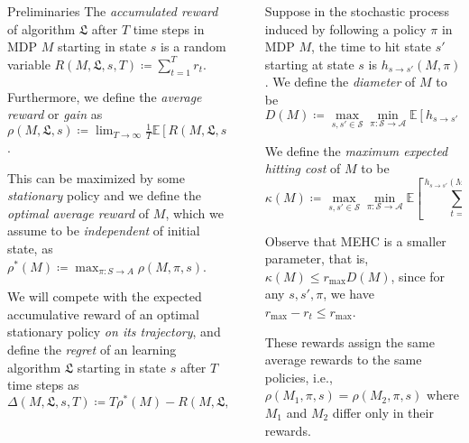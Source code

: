 \documentclass[final]{beamer}
\newcommand{\Exp}{\mathbb{E}}
\newlength{\sepwidth}
\newlength{\colwidth}
\newcommand{\separatorcolumn}{\begin{column}{\sepwidth}\end{column}}
\begin{document}
\begin{frame}[t]
\begin{columns}[t]
\begin{column}{\colwidth}
\begin{block}{Preliminaries}
    The \textit{accumulated reward} of algorithm $\mathfrak{L}$ after $T$ time steps in MDP $M$ starting in state $s$ is a random variable $R(M, \mathfrak{L}, s, T) \coloneqq \sum_{t=1}^T r_t$.

    Furthermore, we define the \textit{average reward} or \textit{gain} as $\rho(M, \mathfrak{L}, s) \coloneqq \lim_{T \rightarrow \infty} \frac{1}{T} \Exp \left[ R(M, \mathfrak{L}, s, T) \right]$.

    This can be maximized by some \textit{stationary} policy and we define the \textit{optimal average reward} of $M$, which we assume to be \textit{independent} of initial state, as $\rho^*(M) \coloneqq \max_{\pi : S \rightarrow A} \rho(M, \pi, s)$.

    We will compete with the expected accumulative reward of an optimal stationary policy \textit{on its trajectory}, and define the \textit{regret} of an learning algorithm $\mathfrak{L}$ starting in state $s$ after $T$ time steps as
    $$ \Delta(M, \mathfrak{L}, s, T) \coloneqq T \rho^*(M) - R(M, \mathfrak{L}, s, T). $$

  \end{block}

\end{column}

\separatorcolumn

\begin{column}{\colwidth}

  Suppose in the stochastic process induced by following a policy $\pi$ in MDP $M$, the time to hit state $s'$ starting at state $s$ is $h_{s \rightarrow s'}(M, \pi)$. We define the \emph{diameter} of $M$ \cite{jaksch2010near} to be
  $$ D(M) \coloneqq \max_{s, s' \in \mathcal{S}} \min_{\pi : \mathcal{S} \rightarrow \mathcal{A}} \Exp \left[ h_{s \rightarrow s'}(M, \pi) \right]. $$

  We define the \emph{maximum expected hitting cost} of $M$ to be
  $$ \kappa(M) \coloneqq \max_{s, s' \in \mathcal{S}} \min_{\pi : \mathcal{S} \rightarrow \mathcal{A}} \Exp \left[ \sum_{t=0}^{h_{s \rightarrow s'}(M, \pi) - 1} r_\text{max} - r_t \right]. $$

  Observe that MEHC is a smaller parameter, that is, $\kappa(M) \leq r_\text{max} D(M)$, since for any $s, s', \pi$, we have $r_\text{max} - r_t \leq r_\text{max}$.

  These rewards assign the same average rewards to the same policies, i.e., $\rho(M_1, \pi, s) = \rho(M_2, \pi, s)$ where $M_1$ and $M_2$ differ only in their rewards.


\end{column}
\end{columns}
\end{frame}
\end{document}
